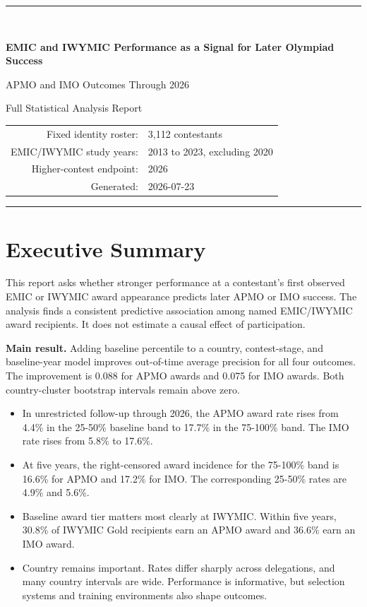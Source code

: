 \documentclass[11pt]{article}
\newcommand{\keyresult}[1]{\par\noindent\colorbox{ReportBlue!9}{\parbox{0.96\linewidth}{#1}}\par}
\begin{document}
\hypersetup{pageanchor=false}
\begin{titlepage}
\centering
\vspace*{1.2in}
{\color{ReportBlue}\rule{\textwidth}{1.5pt}}\\[0.55in]
{\Huge\bfseries EMIC and IWYMIC Performance as a Signal for Later Olympiad Success\par}
\vspace{0.35in}
{\Large APMO and IMO Outcomes Through 2026\par}
\vspace{0.65in}
{\large Full Statistical Analysis Report\par}
\vfill
\begin{tabular}{rl}
Fixed identity roster: & 3,112 contestants \\
EMIC/IWYMIC study years: & 2013 to 2023, excluding 2020 \\
Higher-contest endpoint: & 2026 \\
Generated: & 2026-07-23 \\
\end{tabular}
\vfill
{\color{ReportBlue}\rule{\textwidth}{1.5pt}}
\end{titlepage}

\hypersetup{pageanchor=true}
\tableofcontents
\clearpage
{}

\section{Executive Summary}

This report asks whether stronger performance at a contestant's first observed EMIC or IWYMIC award appearance predicts later APMO or IMO success. The analysis finds a consistent predictive association among named EMIC/IWYMIC award recipients. It does not estimate a causal effect of participation.

\keyresult{\textbf{Main result.} Adding baseline percentile to a country, contest-stage, and baseline-year model improves out-of-time average precision for all four outcomes. The improvement is 0.088 for APMO awards and 0.075 for IMO awards. Both country-cluster bootstrap intervals remain above zero.}

\begin{itemize}
\item In unrestricted follow-up through 2026, the APMO award rate rises from 4.4\% in the 25-50\% baseline band to 17.7\% in the 75-100\% band. The IMO rate rises from 5.8\% to 17.6\%.
\item At five years, the right-censored award incidence for the 75-100\% band is 16.6\% for APMO and 17.2\% for IMO. The corresponding 25-50\% rates are 4.9\% and 5.6\%.
\item Baseline award tier matters most clearly at IWYMIC. Within five years, 30.8\% of IWYMIC Gold recipients earn an APMO award and 36.6\% earn an IMO award.
\item Country remains important. Rates differ sharply across delegations, and many country intervals are wide. Performance is informative, but selection systems and training environments also shape outcomes.
\end{itemize}
\end{document}
